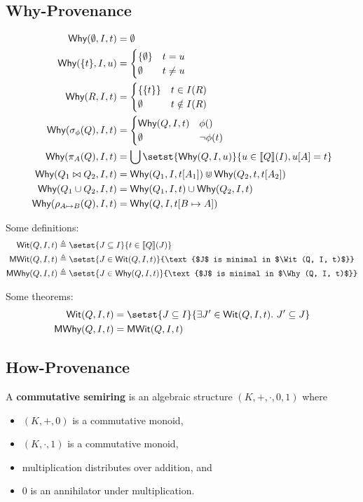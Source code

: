 \subsection{Why-Provenance}
\begin{align*}
  \Why(\emptyset, I, t) &= \emptyset \\
  \Why(\set{t}, I, u) &= \begin{cases}
    \set{\emptyset} & t = u \\
    \emptyset & t \neq u
  \end{cases} \\
  \Why(R, I, t) &= \begin{cases}
    \set{\set{t}} & t \in I(R) \\
    \emptyset & t \notin I(R) \\
  \end{cases} \\
  \Why(\select_\phi(Q), I, t) &= \begin{cases}
    \Why(Q, I, t) & \phi() \\
    \emptyset & \lnot \phi(t)
  \end{cases} \\
  \Why(\project_A(Q), I, t) &= \bigcup \setst{\Why(Q, I, u)}{u \in \denote{Q}(I), u[A] = t} \\
  \Why(Q_1 \join Q_2, I, t) &= \Why(Q_1, I, t[A_1]) \Cup \Why(Q_2, t, t[A_2]) \\
  \Why(Q_1 \cup Q_2, I, t) &= \Why(Q_1, I, t) \cup \Why(Q_2, I, t) \\
  \Why(\rename_{A \mapsto B}(Q), I, t) &= \Why(Q, I, t[B \mapsto A])
\end{align*}

Some definitions:
\begin{align*}
  \Wit(Q, I, t)
    &\defeq \setst{J \subseteq I}{t \in \denote{Q}(J)} \\
  \MWit(Q, I, t)
    &\defeq \setst{J \in \Wit(Q, I, t)}{\text{$J$ is minimal in $\Wit(Q, I, t)$}} \\
  \MWhy(Q, I, t)
    &\defeq \setst{J \in \Why(Q, I, t)}{\text{$J$ is minimal in $\Why(Q, I, t)$}}
\end{align*}

Some theorems:
\begin{align*}
  \Wit(Q, I, t)
    &= \setst{J \subseteq I}{\exists J' \in \Wit(Q, I, t).\ J' \subseteq J} \\
  \MWhy(Q, I, t)
    &= \MWit(Q, I, t)
\end{align*}

\subsection{How-Provenance}
A \textbf{commutative semiring} is an algebraic structure $(K, +, \cdot, 0, 1)$
where
\begin{itemize}
  \item $(K, +, 0)$ is a commutative monoid,
  \item $(K, \cdot, 1)$ is a commutative monoid,
  \item multiplication distributes over addition, and
  \item 0 is an annihilator under multiplication.
\end{itemize}


